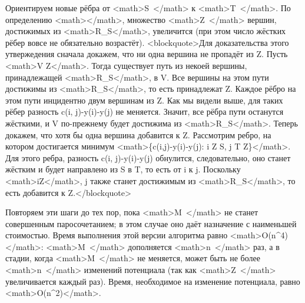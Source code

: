 \documentclass[discrete.tex]{subfiles}
\begin{document}
Ориентируем новые рёбра от <math>S\ </math> к <math>T\ </math>. По определению <math>\Delta</math>, множество <math>Z\ </math> вершин, достижимых из <math>R_S</math>, увеличится (при этом число жёстких рёбер вовсе не обязательно возрастёт).
<blockquote>Для доказательства этого утвержедения сначала докажем, что ни одна вершина не пропадёт из Z. Пусть <math>V \in Z</math>. Тогда существует путь из некоей вершины, принадлежащей <math>R_S</math>, в V. Все вершины на этом пути достижимы из <math>R_S</math>, то есть принадлежат Z. Каждое рёбро на этом пути инцидентно двум вершинам из Z. Как мы видели выше, для таких рёбер разность c(i, j)-y(i)-y(j) не меняется. Значит, все рёбра пути останутся жёсткими, и V по-прежнему будет достижима из <math>R_S</math>. Теперь докажем, что хотя бы одна вершина добавится к Z. Рассмотрим ребро, на котором достигается минимум <math>\min \{c(i,j)-y(i)-y(j): i \in Z \cap S, j \in T \setminus Z\}</math>. Для этого ребра, разность c(i, j)-y(i)-y(j) обнулится, следовательно, оно станет жёстким и будет направлено из S в T, то есть от i к j.
Поскольку <math>i\in Z</math>, j также станет достижимым из <math>R_S</math>, то есть добавится к Z.</blockquote>

Повторяем эти шаги до тех пор, пока <math>M\ </math> не станет совершенным паросочетанием; в этом случае оно даёт назначение с наименьшей стоимостью.
Время выполнения этой версии алгоритма равно <math>O(n^4)</math>: <math>M\ </math> дополняется <math>n\ </math> раз, а в стадии, когда <math>M\ </math> не меняется, может быть не более <math>n\ </math> изменений потенциала (так как <math>Z\ </math> увеличивается каждый раз).
Время, необходимое на изменение потенциала, равно <math>O(n^2)</math>.
\end{document}
